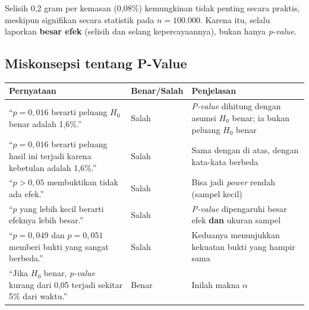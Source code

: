 \documentclass[
  indonesian,
  letterpaper,
]{book}
\newcounter{none} %
\begin{document}
Selisih 0,2 gram per kemasan (0,08\%) kemungkinan tidak penting secara
praktis, meskipun signifikan secara statistik pada \(n = 100.000\).
Karena itu, selalu laporkan \textbf{besar efek} (selisih dan selang
kepercayaannya), bukan hanya \emph{p-value}.

\subsection{Miskonsepsi tentang
P-Value}\label{miskonsepsi-tentang-p-value}

{\def\LTcaptype{none} %
\begin{longtable}[]{@{}
  >{\raggedright\arraybackslash}p{}
  >{\centering\arraybackslash}p{}
  >{\raggedright\arraybackslash}p{}@{}}
\toprule\noalign{}
\begin{minipage}[b]{\linewidth}\raggedright
Pernyataan
\end{minipage} & \begin{minipage}[b]{\linewidth}\centering
Benar/Salah
\end{minipage} & \begin{minipage}[b]{\linewidth}\raggedright
Penjelasan
\end{minipage} \\
\midrule\noalign{}
\endhead
\bottomrule\noalign{}
\endlastfoot
``\(p = 0{,}016\) berarti peluang \(H_0\) benar adalah 1,6\%.'' & Salah
& \emph{P-value} dihitung dengan asumsi \(H_0\) benar; ia bukan peluang
\(H_0\) benar \\
``\(p = 0{,}016\) berarti peluang hasil ini terjadi karena kebetulan
adalah 1,6\%.'' & Salah & Sama dengan di atas, dengan kata-kata
berbeda \\
``\(p > 0{,}05\) membuktikan tidak ada efek.'' & Salah & Bisa jadi
\emph{power} rendah (sampel kecil) \\
``\(p\) yang lebih kecil berarti efeknya lebih besar.'' & Salah &
\emph{P-value} dipengaruhi besar efek \textbf{dan} ukuran sampel \\
``\(p = 0{,}049\) dan \(p = 0{,}051\) memberi bukti yang sangat
berbeda.'' & Salah & Keduanya menunjukkan kekuatan bukti yang hampir
sama \\
``Jika \(H_0\) benar, \emph{p-value} kurang dari 0,05 terjadi sekitar
5\% dari waktu.'' & Benar & Inilah makna \(\alpha\) \\
\end{longtable}
}
\end{document}
